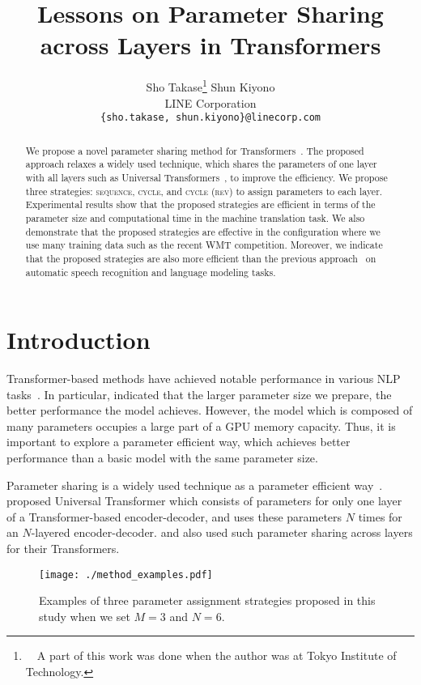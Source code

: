 \documentclass[11pt]{article}
\title{Lessons on Parameter Sharing across Layers in Transformers}
\author{Sho Takase\thanks{\ \ A part of this work was done when the author was at Tokyo Institute of Technology.} \hspace{5mm}
  Shun Kiyono \\
  LINE Corporation \\
  \texttt{\{sho.takase, shun.kiyono\}@linecorp.com} \\
  }
\begin{document}
\maketitle
\begin{abstract}
We propose a novel parameter sharing method for Transformers~\cite{NIPS2017_7181}.
The proposed approach relaxes a widely used technique, which shares the parameters of one layer with all layers such as Universal Transformers~\cite{dehghani2019}, to improve the efficiency.
We propose three strategies: \textsc{sequence}, \textsc{cycle}, and \textsc{cycle (rev)} to assign parameters to each layer.
Experimental results show that the proposed strategies are efficient in terms of the parameter size and computational time in the machine translation task.
We also demonstrate that the proposed strategies are effective in the configuration where we use many training data such as the recent WMT competition.
Moreover, we indicate that the proposed strategies are also more efficient than the previous approach~\cite{dehghani2019} on automatic speech recognition and language modeling tasks.
\end{abstract}


\section{Introduction}
\label{sec:intro}
Transformer-based methods have achieved notable performance in various NLP tasks~\cite{NIPS2017_7181,devlin-etal-2019-bert,NEURIPS2020_1457c0d6}.
In particular, \citet{NEURIPS2020_1457c0d6} indicated that the larger parameter size we prepare, the better performance the model achieves.
However, the model which is composed of many parameters occupies a large part of a GPU memory capacity.
Thus, it is important to explore a parameter efficient way, which achieves better performance than a basic model with the same parameter size.


Parameter sharing is a widely used technique as a parameter efficient way~\cite{dehghani2019,Dabre_Fujita_2019,lan2020}.
\citet{dehghani2019} proposed Universal Transformer which consists of parameters for only one layer of a Transformer-based encoder-decoder, and uses these parameters $N$ times for an $N$-layered encoder-decoder.
\citet{Dabre_Fujita_2019} and \citet{lan2020} also used such parameter sharing across layers for their Transformers.

\begin{figure}[!t]
  \centering 
  \texttt{[image: ./method\_examples.pdf]}
   \caption{Examples of three parameter assignment strategies proposed in this study when we set $M=3$ and $N=6$.}
   \label{fig:overview}
\end{figure}
\end{document}
